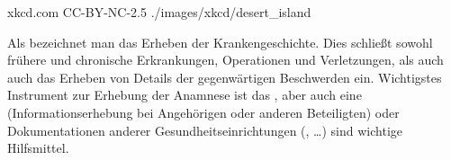 {}%
{}%
{xkcd.com}%
{CC-BY-NC-2.5}%
{./images/xkcd/desert_island}%
{}%
{}%

\Text
{{\TxBeschreibung}}%
{%
%
Als  bezeichnet man das Erheben der
Krankengeschichte. Dies schließt sowohl frühere und
chronische Erkrankungen, Operationen und Verletzungen, als
auch auch das Erheben von Details der gegenwärtigen Beschwerden ein. 
Wichtigstes
Instrument zur Erhebung der Anamnese ist das
, aber auch eine 
(Informationserhebung bei Angehörigen oder anderen
Beteiligten) oder Dokumentationen anderer
Gesundheitseinrichtungen (, \ldots) sind
wichtige Hilfsmittel.
}%





